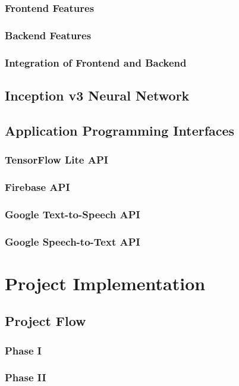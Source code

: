 \documentclass{article}
\begin{document}
			\subsubsection{Frontend Features}
			\subsubsection{Backend Features}
			\subsubsection{Integration of Frontend and Backend}
		\subsection{Inception v3 Neural Network}
		\subsection{Application Programming Interfaces}
			\subsubsection{TensorFlow Lite API}
			\subsubsection{Firebase API}
			\subsubsection{Google Text-to-Speech API}
			\subsubsection{Google Speech-to-Text API}

	\newpage


	\section{Project Implementation}

		\subsection{Project Flow}
			\subsubsection{Phase I}
			\subsubsection{Phase II}
\end{document}
